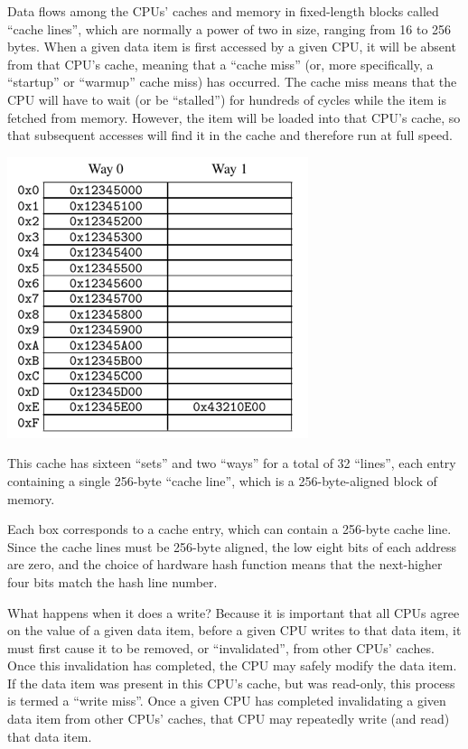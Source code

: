 \documentclass[11pt]{article}
\begin{document}
Data flows among the CPUs’ caches and memory in fixed-length blocks called “cache lines”, which
are normally a power of two in size, ranging from 16 to 256 bytes. When a given data item is
first accessed by a given CPU, it will be absent from that CPU’s cache, meaning that a “cache
miss” (or, more specifically, a “startup” or “warmup” cache miss) has occurred. The cache miss
means that the CPU will have to wait (or be “stalled”) for hundreds of cycles while the item is
fetched from memory. However, the item will be loaded into that CPU’s cache, so that subsequent
accesses will find it in the cache and therefore run at full speed.

\begin{center}
\includegraphics[width=.8\textwidth]{../images/perfbook/2.png}
\end{center}

This cache has sixteen “sets” and two “ways” for a total of 32 “lines”, each entry containing a
single 256-byte “cache line”, which is a 256-byte-aligned block of memory.

Each box corresponds to a cache entry, which can contain a 256-byte cache line. Since the cache
lines must be 256-byte aligned, the low eight bits of each address are zero, and the choice of
hardware hash function means that the next-higher four bits match the hash line number.

What happens when it does a write? Because it is important that all CPUs agree on the value of a
given data item, before a given CPU writes to that data item, it must first cause it to be
removed, or “invalidated”, from other CPUs’ caches. Once this invalidation has completed, the
CPU may safely modify the data item. If the data item was present in this CPU’s cache, but was
read-only, this process is termed a “write miss”. Once a given CPU has completed invalidating a
given data item from other CPUs’ caches, that CPU may repeatedly write (and read) that data
item.
\end{document}
